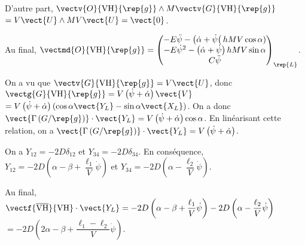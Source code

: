 \begin{multicols}{2}
\begin{corrige}
  D'autre part, $\vectv{O}{\text{VH}}{\rep{g}} \wedge M\vectv{G}{\text{VH}}{\rep{g}}$ $=V\vect{U}\wedge MV\vect{U} = \vect{0}$.
  
  Au final, $\vectmd{O}{\text{VH}}{\rep{g}} = \begin{pmatrix} 
  -E\ddot{\psi} - \left(\dot{\alpha} + \dot{\psi}\right( hMV\cos\alpha)\\ 
  -E\dot{\psi}^2 -\left(\dot{\alpha} +\dot{\psi}\right)  hMV \sin\alpha\\ 
  C\ddot{\psi} \end{pmatrix}_{\rep{L}} 
  $.

\end{corrige}
\else
\fi
{}
\ifprof
\begin{corrige}
On a vu que $\vectv{G}{\text{VH}}{\rep{g}} = V\vect{U}$, donc  $\vectg{G}{\text{VH}}{\rep{g}} = V\left(\dot{\psi}+\dot{\alpha} \right)\vect{V}$
$= V\left(\dot{\psi}+\dot{\alpha} \right)\left( \cos\alpha \vect{Y_L} - \sin\alpha \vect{X_L} \right)$. 
On a donc  $\vect{\Gamma\left(G/\rep{g} \right)}\cdot \vect{Y_L} = V\left(\dot{\psi}+\dot{\alpha} \right) \cos\alpha  $.
En linéarisant cette relation, on a  $\vect{\Gamma\left(G/\rep{g} \right)}\cdot \vect{Y_L} = V\left(\dot{\psi}+\dot{\alpha} \right)$.

\end{corrige}
\else
\fi


\ifprof
\begin{corrige}
On a $Y_{12}=-2D\delta_{12}$ et $Y_{34}=-2D\delta_{34}$. En conséquence, 
$Y_{12}=-2D\left( \alpha-\beta+\dfrac{\ell_1}{V}\dot{\psi} \right)$ et $Y_{34}=-2D \left(  \alpha-\dfrac{\ell_2}{V}\dot{\psi}\right)$.

Au final, $\vectf{\overline{\text{VH}}}{\text{VH}}\cdot \vect{Y_L} =-2D\left( \alpha-\beta+\dfrac{\ell_1}{V}\dot{\psi} \right) -2D \left(  \alpha-\dfrac{\ell_2}{V}\dot{\psi}\right)$ $=-2D\left( 2\alpha-\beta+\dfrac{\ell_1-\ell_2}{V}\dot{\psi} \right)$.



\end{corrige}
\end{multicols}
